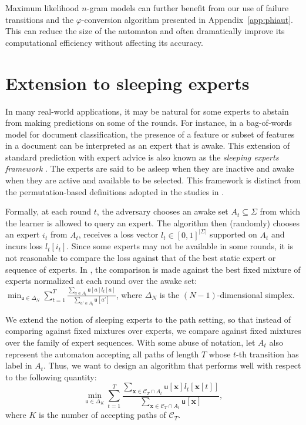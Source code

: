 \documentclass{article}
\newcommand{\sC}{\mathscr C}
\newcommand{\bx}{{\mathbf x}}
\newcommand{\sfu}{{\mathsf u}}
\renewcommand{\phi}{\varphi}
\begin{document}
Maximum likelihood $n$-gram models can further benefit from our use of
failure transitions and the $\phi$-conversion algorithm presented in
Appendix~\ref{app:phiaut}. This can reduce the size of the automaton
and often dramatically improve its computational efficiency without
affecting its accuracy.

\section{Extension to sleeping experts}
\label{sec:sleep}

In many real-world applications, it may be natural for some experts to
abstain from making predictions on some of the rounds. For instance,
in a bag-of-words model for document classification, the presence of a
feature or subset of features in a document can be interpreted as an
expert that is awake. This extension of standard prediction with
expert advice is also known as the \emph{sleeping experts framework}
\citep{FreundSchapireSingerWarmuth1997}.  The experts are said to be
asleep when they are inactive and awake when they are active and available
to be selected. This framework is distinct from the
permutation-based definitions adopted in the studies in \citep{KleinbergNiculescuMizilSharma2010, KanadeMcMahanBryan2009, KanadeSteinke2014}.  

Formally, at each round $t$, the adversary chooses an awake set
$A_t \subseteq \Sigma$ from which the learner is allowed to query an
expert.  The algorithm then (randomly) chooses an expert $i_t$ from
$A_t$, receives a loss vector $l_t \in [0,1]^{|\Sigma|}$ supported on
$A_t$ and incurs loss $l_t[i_t]$. Since some experts may not be
available in some rounds, it is not reasonable to compare the loss
against that of the best static expert or sequence of experts. In
\citep{FreundSchapireSingerWarmuth1997}, the comparison is made
against the best fixed mixture of experts normalized at each round
over the awake set:
$\min_{\sfu \in \Delta_N}\sum_{t = 1}^T \frac{\sum_{a \in A_t} \sfu[a] l_t[a]
}{\sum_{a' \in A_t} \sfu[a']}$, where $\Delta_N$ is the $(N-1)$-dimensional 
simplex.

We extend the notion of sleeping experts to the path setting, so that
instead of comparing against fixed mixtures over experts, we compare
against fixed mixtures over the family of expert sequences. With some
abuse of notation, let $A_t$ also represent the automaton accepting
all paths of length $T$ whose $t$-th transition has label in $A_t$.
Thus, we want to design an algorithm that performs well with respect
to the following quantity:
$$\min_{\sfu \in \Delta_K}\sum_{t = 1}^T \frac{\sum_{\bx \in \sC_T \cap A_t} \sfu[\bx] l_t[\bx[t]] }{\sum_{\bx \in \sC_T \cap A_t} \sfu[\bx]},$$
where $K$ is the number of accepting paths of $\sC_T$.
\end{document}
